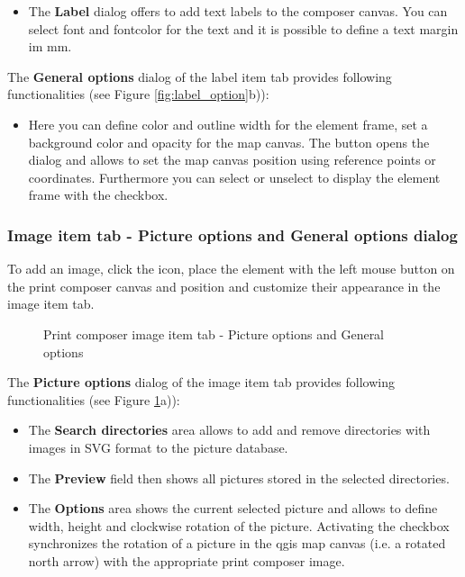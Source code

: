 \begin{itemize}
\item The \textbf{Label} dialog offers to add text labels to the composer
canvas. You can select font and fontcolor for the text and it is possible to
define a text margin im mm.
\end{itemize}


The \textbf{General options} dialog of the label item tab provides following
functionalities (see Figure \ref{fig:label_option}b)):

\begin{itemize}
\item Here you can define color and outline width for the element frame, set
a background color and opacity for the map canvas. The 
button opens the  dialog and allows to set the map
canvas position using reference points or coordinates. Furthermore you can
select or unselect to display the element frame with the  checkbox.
\end{itemize}

\subsubsection{Image item tab - Picture options and General options dialog}

To add an image, click the 
icon, place the element with the left mouse button on the print composer
canvas and position and customize their appearance in the image item tab.

\begin{figure}[ht]
\centering
\caption{Print composer image item tab - Picture options and General options
\nixcaption}\label{fig:imageoptions}
   \goodgap
\end{figure}


The \textbf{Picture options} dialog of the image item tab provides following
functionalities (see Figure \ref{fig:imageoptions}a)):

\begin{itemize}
\item The \textbf{Search directories} area allows to add and remove
directories with images in SVG format to the picture database. 
\item The \textbf{Preview} field then shows all pictures stored in the
selected directories.
\item The \textbf{Options} area shows the current selected picture and allows
to define width, height and clockwise rotation of the picture. Activating the
 checkbox synchronizes the rotation of a picture in
the qgis map canvas (i.e. a rotated north arrow) with the appropriate print
composer image.
\end{itemize}

